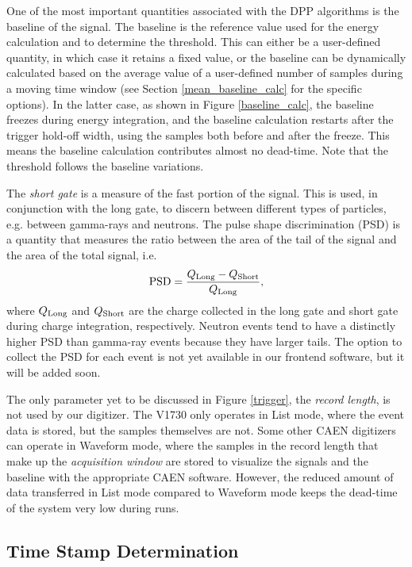 One of the most important quantities associated with the DPP algorithms is the baseline of the signal. The baseline is the reference value used for the energy calculation and to determine the threshold. This can either be a user-defined quantity, in which case it retains a fixed value, or the baseline can be dynamically calculated based on the average value of a user-defined number of samples during a moving time window (see Section \ref{mean_baseline_calc} for the specific options). In the latter case, as shown in Figure \ref{baseline_calc}, the baseline freezes during energy integration, and the baseline calculation restarts after the trigger hold-off width, using the samples both before and after the freeze. This means the baseline calculation contributes almost no dead-time. Note that the threshold follows the baseline variations.

The \textit{short gate} is a measure of the fast portion of the signal. This is used, in conjunction with the long gate, to discern between different types of particles, e.g. between gamma-rays and neutrons. The pulse shape discrimination (PSD) is a quantity that measures the ratio between the area of the tail of the signal and the area of the total signal, i.e.
\begin{equation*}
\textnormal{PSD} = \frac{Q_{\textnormal{Long}} - Q_{\textnormal{Short}}}{Q_{\textnormal{Long}}},
\end{equation*}
where $Q_{\textnormal{Long}}$ and $Q_{\textnormal{Short}}$ are the charge collected in the long gate and short gate during charge integration, respectively. Neutron events tend to have a distinctly higher PSD than gamma-ray events because they have larger tails. The option to collect the PSD for each event is not yet available in our frontend software, but it will be added soon.

The only parameter yet to be discussed in Figure \ref{trigger}, the \textit{record length}, is not used by our digitizer. The V1730 only operates in List mode, where the event data is stored, but the samples themselves are not. Some other CAEN digitizers can operate in Waveform mode, where the samples in the record length that make up the \textit{acquisition window} are stored to visualize the signals and the baseline with the appropriate CAEN software. However, the reduced amount of data transferred in List mode compared to Waveform mode keeps the dead-time of the system very low during runs.

\subsection{Time Stamp Determination} \label{time_stamp}


